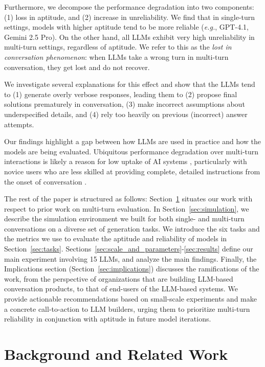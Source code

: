 \documentclass{article}
\begin{document}
Furthermore, we decompose the performance degradation into two components: (1) loss in aptitude, and (2) increase in unreliability.
We find that in single-turn settings, models with higher aptitude tend to be more reliable (\textit{e.g.}, GPT-4.1, Gemini 2.5 Pro). 
On the other hand, all LLMs exhibit very high unreliability in multi-turn settings, regardless of aptitude.
We refer to this as the \textit{lost in conversation phenomenon}: when LLMs take a wrong turn in multi-turn conversation, they get lost and do not recover.

We investigate several explanations for this effect and show that the LLMs tend to (1) generate overly verbose responses, leading them to (2) propose final solutions prematurely in conversation, (3) make incorrect assumptions about underspecified details, and (4) rely too heavily on previous (incorrect) answer attempts.

Our findings highlight a gap between how LLMs are used in practice and how the models are being evaluated. Ubiquitous performance degradation over multi-turn interactions is likely a reason for low uptake of AI systems \cite{southworth2023developing,Brauner2023WhatDT,horowitz2024adopting}, particularly with novice users who are less skilled at providing complete, detailed instructions from the onset of conversation \cite{zamfirescu2023johnny,Knoth2024AILA}.

The rest of the paper is structured as follows: Section~\ref{sec:background} situates our work with respect to prior work on multi-turn evaluation. In Section~\ref{sec:simulation}, we describe the simulation environment we built for both single- and multi-turn conversations on a diverse set of generation tasks.
We introduce the six tasks and the metrics we use to evaluate the aptitude and reliability of models in Section~\ref{sec:tasks}. Sections~\ref{sec:scale_and_parameters}-\ref{sec:results} define our main experiment involving 15 LLMs, and analyze the main findings.
Finally, the Implications section (Section~\ref{sec:implications}) discusses the ramifications of the work, from the perspective of organizations that are building LLM-based conversation products, to that of end-users of the LLM-based systems.
We provide actionable recommendations based on small-scale experiments and make a concrete call-to-action to LLM builders, urging them to prioritize multi-turn reliability in conjunction with aptitude in future model iterations.

\section{Background and Related Work} \label{sec:background}
\end{document}
